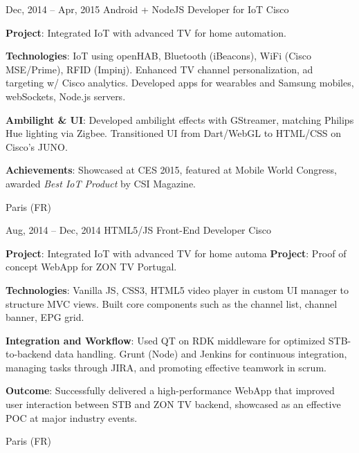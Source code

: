 \documentclass[
  a4paper,
   maincolor=cvblue,
   sectioncolor=cvblue,
   sidebarwidth=0.323\paperwidth,
]{fortysecondscv}
\begin{document}
\begin{cvtableNew}
  \cvitemRightNew
    {Dec, 2014 – Apr, 2015} %
    {Android + NodeJS Developer for IoT} %
    {Cisco} %
    {
      \vspace{1pt} %
      \fontsize{10.8pt}{12pt}\selectfont %
      \textbf{Project}: Integrated IoT with advanced TV for home automation.\par
      \vspace{4pt}
      \textbf{Technologies}: IoT using openHAB, Bluetooth (iBeacons), WiFi (Cisco MSE/Prime), RFID (Impinj). Enhanced TV channel personalization, ad targeting w/ Cisco analytics. Developed apps for wearables and Samsung mobiles, webSockets, Node.js servers.\par
      \vspace{4pt}
      \textbf{Ambilight \& UI}: Developed ambilight effects with GStreamer, matching Philips Hue lighting via Zigbee. Transitioned UI from Dart/WebGL to HTML/CSS on Cisco’s JUNO.\par
      \vspace{4pt}
      \textbf{Achievements}: Showcased at CES 2015, featured at Mobile World Congress, awarded \textit{Best IoT Product} by CSI Magazine.\par
      \vspace{4pt} %
    }
    {Paris (FR)} %

    \vspace{1.2mm} %

    \cvitemRightNew
    {Aug, 2014 – Dec, 2014} %
    {HTML5/JS Front-End Developer} %
    {Cisco} %
    {
      \vspace{1pt} %
      \fontsize{10.8pt}{12pt}\selectfont %
      \textbf{Project}: Integrated IoT with advanced TV for home automa
      \textbf{Project}: Proof of concept WebApp for ZON TV Portugal.\par
      \vspace{4pt}
      \textbf{Technologies}: Vanilla JS, CSS3, HTML5 video player in custom UI manager to structure MVC views. Built core components such as the channel list, channel banner, EPG grid.\par
      \vspace{4pt}
      \textbf{Integration and Workflow}: Used QT on RDK middleware for optimized STB-to-backend data handling. Grunt (Node) and Jenkins for continuous integration, managing tasks through JIRA, and promoting effective teamwork in scrum.\par
      \vspace{4pt}
      \textbf{Outcome}: Successfully delivered a high-performance WebApp that improved user interaction between STB and ZON TV backend, showcased as an effective POC at major industry events.
    }
    {Paris (FR)} %
\end{cvtableNew}
\end{document}
